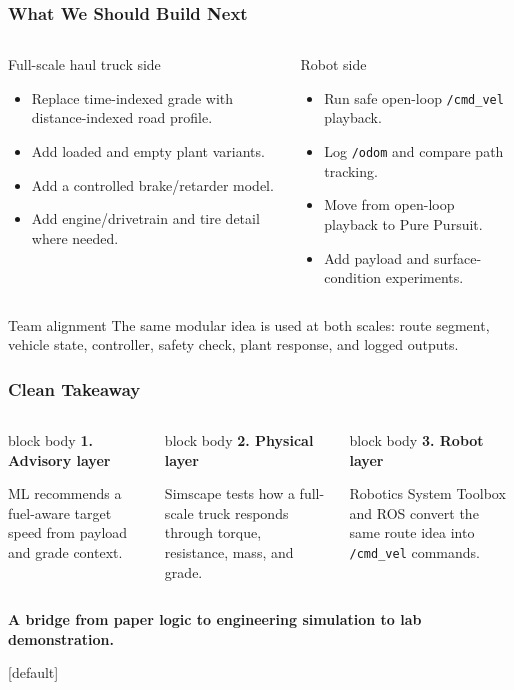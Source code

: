 \documentclass[aspectratio=169]{beamer}
\newcommand{\metricbox}[3]{%
  \begin{beamercolorbox}[wd=#1,rounded=true,shadow=false,sep=0.08cm]{block body}
    {\footnotesize\textbf{\textcolor{ArizonaBlue}{#2}}}\par
    {\scriptsize #3}
  \end{beamercolorbox}
}
\begin{document}
\begin{frame}
\frametitle{What We Should Build Next}

\begin{columns}[T,totalwidth=\textwidth]
\begin{block}{Full-scale haul truck side}
\small
\begin{itemize}
    \item Replace time-indexed grade with distance-indexed road profile.
    \item Add loaded and empty plant variants.
    \item Add a controlled brake/retarder model.
    \item Add engine/drivetrain and tire detail where needed.
\end{itemize}
\end{block}

\begin{block}{Robot side}
\small
\begin{itemize}
    \item Run safe open-loop \texttt{/cmd\_vel} playback.
    \item Log \texttt{/odom} and compare path tracking.
    \item Move from open-loop playback to Pure Pursuit.
    \item Add payload and surface-condition experiments.
\end{itemize}
\end{block}
\end{columns}

\vspace{0.35cm}
\begin{alertblock}{Team alignment}
\small
The same modular idea is used at both scales: route segment, vehicle state, controller, safety check, plant response, and logged outputs.
\end{alertblock}

\end{frame}

\begin{frame}
\frametitle{Clean Takeaway}

\begin{columns}[T,totalwidth=\textwidth]
\metricbox{\textwidth}{1. Advisory layer}{ML recommends a fuel-aware target speed from payload and grade context.}

\metricbox{\textwidth}{2. Physical layer}{Simscape tests how a full-scale truck responds through torque, resistance, mass, and grade.}

\metricbox{\textwidth}{3. Robot layer}{Robotics System Toolbox and ROS convert the same route idea into \texttt{/cmd\_vel} commands.}
\end{columns}

\vspace{0.85cm}
\begin{center}
\large
\textbf{\textcolor{ArizonaBlue}{A bridge from paper logic to engineering simulation to lab demonstration.}}
\end{center}

\end{frame}

\finalpage

[default]
\end{document}
